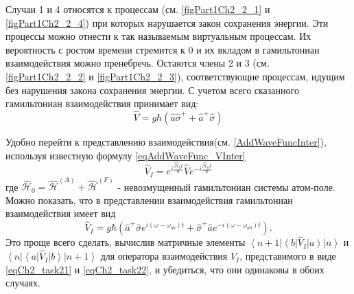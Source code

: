 Случаи 1 и 4 относятся к процессам (см. \autoref{figPart1Ch2_2_1} и
\ref{figPart1Ch2_2_4}) при которых нарушается закон сохранения энергии.
Эти процессы можно отнести к так называемым виртуальным процессам. Их
вероятность с ростом времени стремится к 0 и
их вкладом в гамильтониан взаимодействия можно
пренебречь. Остаются члены 2 и 3 (см. \autoref{figPart1Ch2_2_2} и
\ref{figPart1Ch2_2_3}), соответствующие процессам,
идущим без нарушения закона сохранения энергии. С учетом всего
сказанного гамильтониан взаимодействия принимает вид: 
\begin{equation}
\hat{V} = g \hbar \left(
\hat{a}\hat{\sigma}^{+} + 
\hat{a}^{+}\hat{\sigma}
\right)
\end{equation}

Удобно перейти к представлению взаимодействия(см. \autoref{AddWaveFuncInter}),
используя известную 
формулу \eqref{eqAddWaveFunc_VInter}
\begin{equation}
\hat{V}_I = 
e^{i \frac{\hat{\mathcal{H}}_0 t}{\hbar}}
\hat{V}
e^{- i \frac{\hat{\mathcal{H}}_0 t}{\hbar}}
\label{eqCh2_task21}
\end{equation}
где 
\(
\hat{\mathcal{H}}_0 = 
\hat{\mathcal{H}}^{\left(A\right)} +
\hat{\mathcal{H}}^{\left(F\right)}
\)
- невозмущенный гамильтониан системы атом-поле. Можно показать, что в
представлении взаимодействия гамильтониан взаимодействия имеет вид 
\begin{equation}
\hat{V}_I = 
g \hbar \left(
\hat{a}^{+}\hat{\sigma} e^{i \left(\omega - \omega_{ab}\right)t} +
\hat{\sigma}^{+} \hat{a} e^{-i \left(\omega - \omega_{ab}\right)t}
\right).
\label{eqCh2_task22}
\end{equation}
Это проще всего сделать, вычислив матричные элементы 
$\left<n +
1\right|\left<b\right|\hat{V}_I\left|a\right>\left|n\right>$ и
$\left<n\right|\left<a\right|\hat{V}_I\left|b\right>\left|n +
1\right>$ для оператора взаимодействия $\hat{V}_I$, представимого в
виде \eqref{eqCh2_task21} и \eqref{eqCh2_task22}, и убедиться, что они
одинаковы в обоих случаях.
